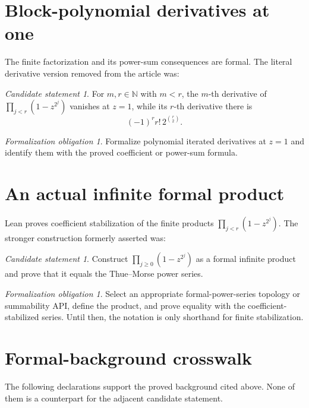 \documentclass[11pt,oneside]{article}
\theoremstyle{definition}
\theoremstyle{remark}
\newcommand{\N}{\mathbb N}
\newtheorem{candidate}[theorem]{Candidate statement}
\newtheorem{obligation}[theorem]{Formalization obligation}
\begin{document}
\section{Block-polynomial derivatives at one}

The finite factorization and its power-sum consequences are formal.  The literal derivative
version removed from the article was:
\begin{candidate}
For \(m,r\in\N\) with \(m<r\), the \(m\)-th derivative of
\(\prod_{j<r}(1-z^{2^j})\) vanishes at \(z=1\), while its \(r\)-th derivative there is
\[
 (-1)^r r!\,2^{\binom r2}.
\]
\end{candidate}
\begin{obligation}
Formalize polynomial iterated derivatives at \(z=1\) and identify them with the proved
coefficient or power-sum formula.
\end{obligation}

\section{An actual infinite formal product}

Lean proves coefficient stabilization of the finite products
\(\prod_{j<r}(1-z^{2^j})\).  The stronger construction formerly asserted was:
\begin{candidate}
Construct \(\prod_{j\ge0}(1-z^{2^j})\) as a formal infinite product and prove that it equals
the Thue--Morse power series.
\end{candidate}
\begin{obligation}
Select an appropriate formal-power-series topology or summability API, define the product,
and prove equality with the coefficient-stabilized series.  Until then, the notation is
only shorthand for finite stabilization.
\end{obligation}

\section{Formal-background crosswalk}

The following declarations support the proved background cited above.  None of them is a
counterpart for the adjacent candidate statement.
\end{document}
